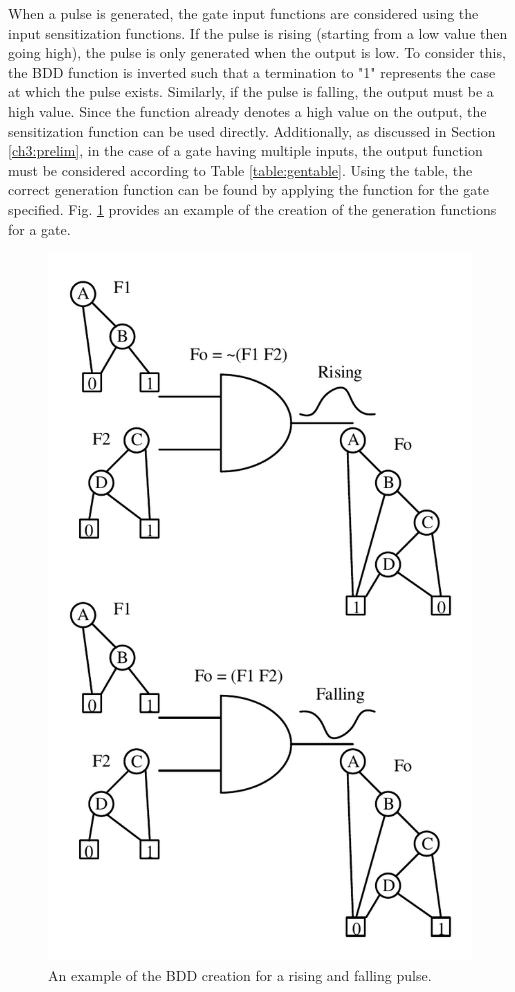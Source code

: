 When a pulse is generated, the gate input functions are considered using the input sensitization functions. If the pulse is rising (starting from a low value then going high), the pulse is only generated when the output is low. To consider this, the BDD function is inverted such that a termination to "1" represents the case at which the pulse exists. Similarly, if the pulse is falling, the output must be a high value. Since the function already denotes a high value on the output, the sensitization function can be used directly. Additionally, as discussed in Section \ref{ch3:prelim}, in the case of a gate having multiple inputs, the output function must be considered according to Table \ref{table:gentable}. Using the table, the correct generation function can be found by applying the function for the gate specified. Fig. \ref{BDD_GEN} provides an example of the creation of the generation functions for a gate.

\begin{figure}[!htbp]
	\centering
	\includegraphics[width=0.65\linewidth]{Figures/gen_func}
	\caption{An example of the BDD creation for a rising and falling pulse.}
	\label{BDD_GEN}
\end{figure}

